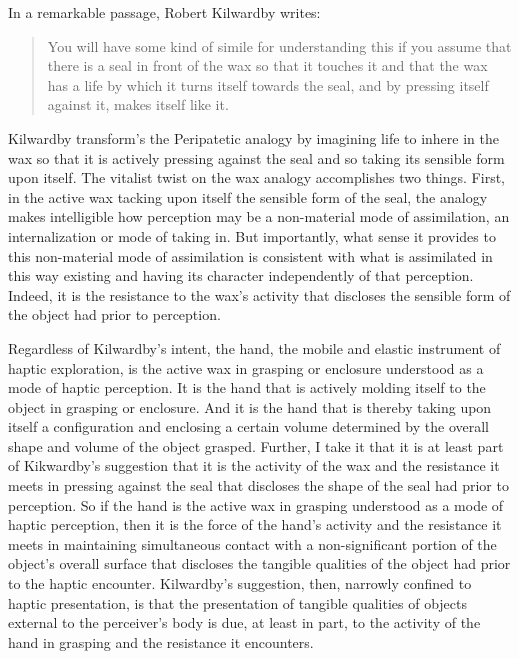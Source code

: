 \documentclass[12pt]{article}
\begin{document}
In a remarkable passage, Robert Kilwardby writes:
\begin{quote}
	You will have some kind of simile for understanding this if you assume that there is a seal in front of the wax so that it touches it and that the wax has a life by which it turns itself towards the seal, and by pressing itself against it, makes itself like it.
\end{quote}
Kilwardby transform's the Peripatetic analogy by imagining life to inhere in the wax so that it is actively pressing against the seal and so taking its sensible form upon itself. The vitalist twist on the wax analogy accomplishes two things. First, in the active wax tacking upon itself the sensible form of the seal, the analogy makes intelligible how perception may be a non-material mode of assimilation, an internalization or mode of taking in. But importantly, what sense it provides to this non-material mode of assimilation is consistent with what is assimilated in this way existing and having its character independently of that perception. Indeed, it is the resistance to the wax's activity that discloses the sensible form of the object had prior to perception.

Regardless of Kilwardby's intent, the hand, the mobile and elastic instrument of haptic exploration, is the active wax in grasping or enclosure understood as a mode of haptic perception. It is the hand that is actively molding itself to the object in grasping or enclosure. And it is the hand that is thereby taking upon itself a configuration and enclosing a certain volume determined by the overall shape and volume of the object grasped. Further, I take it that it is at least part of Kikwardby's suggestion that it is the activity of the wax and the resistance it meets in pressing against the seal that discloses the shape of the seal had prior to perception. So if the hand is the active wax in grasping understood as a mode of haptic perception, then it is the force of the hand's activity and the resistance it meets in maintaining simultaneous contact with a non-significant portion of the object's overall surface that discloses the tangible qualities of the object had prior to the haptic encounter. Kilwardby's suggestion, then, narrowly confined to haptic presentation, is that the presentation of tangible qualities of objects external to the perceiver's body is due, at least in part, to the activity of the hand in grasping and the resistance it encounters. 

\end{document}
